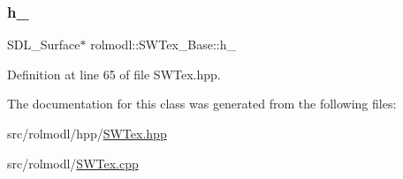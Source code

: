 \subsubsection{\texorpdfstring{h\_}{h\_}}
{\footnotesize\ttfamily S\+D\+L\+\_\+\+Surface$\ast$ rolmodl\+::\+S\+W\+Tex\+\_\+\+Base\+::h\+\_\+\hspace{0.3cm}{\ttfamily [protected]}}



Definition at line 65 of file S\+W\+Tex.\+hpp.



The documentation for this class was generated from the following files\+:\begin{DoxyCompactItemize}
\item 
src/rolmodl/hpp/\mbox{\hyperlink{_s_w_tex_8hpp}{S\+W\+Tex.\+hpp}}\item 
src/rolmodl/\mbox{\hyperlink{_s_w_tex_8cpp}{S\+W\+Tex.\+cpp}}\end{DoxyCompactItemize}
